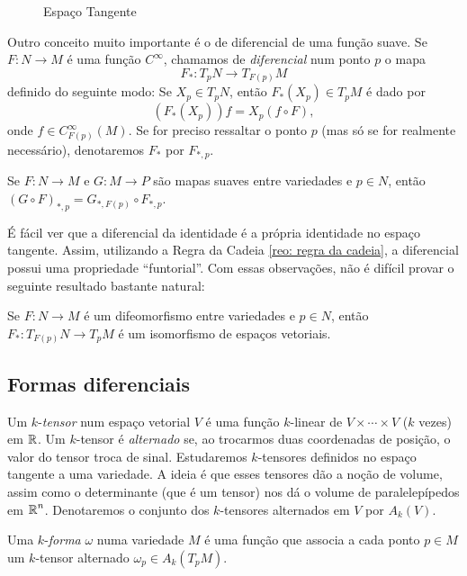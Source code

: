 \begin{figure}[H]
	\centering
	
	\caption{Espaço Tangente}
\end{figure}

Outro conceito muito importante é o de diferencial de uma função suave. Se $F: N \longrightarrow M$ é uma função $C^\infty$, chamamos de \textit{diferencial} num ponto $p$ o mapa
\[
F_*: T_pN \longrightarrow T_{F(p)}M
\]
definido do seguinte modo: Se $X_p \in T_pN$, então $F_*(X_p) \in T_pM$ é dado por
\[
(F_*(X_p))f = X_p(f \circ F),
\]
onde $f \in C^{\infty}_{F(p)}(M)$. Se for preciso ressaltar o ponto $p$ (mas só se for realmente necessário), denotaremos $F_*$ por $F_{*,p}$.

\begin{teorema}\label{reo: regra da cadeia}
	Se $F: N \longrightarrow M$ e $G: M \longrightarrow P$ são mapas suaves entre variedades e $p \in N$, então $(G \circ F)_{*,p} = G_{*,F(p)} \circ F_{*,p}$.
\end{teorema}

É fácil ver que a diferencial da identidade é a própria identidade no espaço tangente. Assim, utilizando a Regra da Cadeia \ref{reo: regra da cadeia}, a diferencial possui uma propriedade ``funtorial''. Com essas observações, não é difícil provar o seguinte resultado bastante natural:

\begin{proposicao}
	Se $F: N \longrightarrow M$ é um difeomorfismo entre variedades e $p \in N$, então $F_*: T_{F(p)}N \longrightarrow T_pM$ é um isomorfismo de espaços vetoriais.
\end{proposicao}

\subsection{Formas diferenciais}

Um $k$-\textit{tensor} num espaço vetorial $V$ é uma função $k$-linear de $V \times \dotsb \times V$ ($k$ vezes) em $\operatorname{\mathbb{R}}$. Um $k$-tensor é \textit{alternado} se, ao trocarmos duas coordenadas de posição, o valor do tensor troca de sinal. Estudaremos $k$-tensores definidos no espaço tangente a uma variedade. A ideia é que esses tensores dão a noção de volume, assim como o determinante (que é um tensor) nos dá o volume de paralelepípedos em $\operatorname{\mathbb{R}}^n$. Denotaremos o conjunto dos $k$-tensores alternados em $V$ por $A_k(V)$.

\begin{definicao}
	Uma $k$-\textit{forma} $\omega$ numa variedade $M$ é uma função que associa a cada ponto $p \in M$ um $k$-tensor alternado $\omega_p \in A_k(T_pM)$.
\end{definicao}

